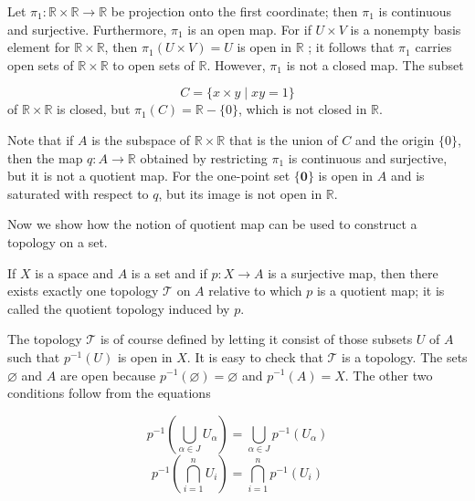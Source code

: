 \begin{centeredblock}
\begin{example}
\label{ex:\thesection.\theexample}
 Let \({\pi }_{1} : \mathbb{R} \times \mathbb{R} \rightarrow \mathbb{R}\) be projection onto the first coordinate; then \({\pi }_{1}\) is continuous and surjective. Furthermore, \({\pi }_{1}\) is an open map. For if \(U \times V\) is a nonempty basis element for \(\mathbb{R} \times \mathbb{R}\), then \({\pi }_{1}( {U \times V}) = U\) is open in \(\mathbb{R}\) ; it follows that \({\pi }_{1}\) carries open sets of \(\mathbb{R} \times \mathbb{R}\) to open sets of \(\mathbb{R}\). However, \({\pi }_{1}\) is not a closed map. The subset

 \[
 C = \{ x \times y \mid {xy} = 1\}
 \]
 of \(\mathbb{R} \times \mathbb{R}\) is closed, but \({\pi }_{1}( C) = \mathbb{R} - \{ 0\}\), which is not closed in \(\mathbb{R}\).

 Note that if \(A\) is the subspace of \(\mathbb{R} \times \mathbb{R}\) that is the union of \(C\) and the origin \(\{ 0\}\), then the map \(q : A \rightarrow \mathbb{R}\) obtained by restricting \({\pi }_{1}\) is continuous and surjective, but it is not a quotient map. For the one-point set \(\{ \mathbf{0}\}\) is open in \(A\) and is saturated with respect to \(q\), but its image is not open in \(\mathbb{R}\).
\end{example}
\end{centeredblock}

Now we show how the notion of quotient map can be used to construct a topology on a set.

\begin{definition}
 If \(X\) is a space and \(A\) is a set and if \(p : X \rightarrow A\) is a surjective map, then there exists exactly one topology \(\mathcal{T}\) on \(A\) relative to which \(p\) is a quotient map; it is called the quotient topology induced by \(p\).
\end{definition}

The topology \(\mathcal{T}\) is of course defined by letting it consist of those subsets \(U\) of \(A\) such that \(p^{-1}( U)\) is open in \(X\). It is easy to check that \(\mathcal{T}\) is a topology. The sets \(\varnothing\) and \(A\) are open because \(p^{-1}( \varnothing ) = \varnothing\) and \(p^{-1}( A) = X\). The other two conditions follow from the equations

\[
p^{-1}( {\mathop{\bigcup }\limits_{{\alpha \in J}}U_{\alpha }}) = \mathop{\bigcup }\limits_{{\alpha \in J}}p^{-1}( U_{\alpha })
\]
\[
p^{-1}( {\mathop{\bigcap }\limits_{{i = 1}}^{n}U_{i}}) = \mathop{\bigcap }\limits_{{i = 1}}^{n}p^{-1}( U_{i})
\]

